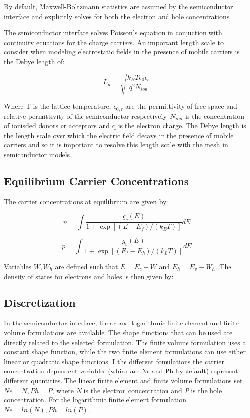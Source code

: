 By default, Maxwell-Boltzmann statistics are assumed by the semiconductor interface and explicitly solves for both the electron and hole concentrations.

The semiconductor interface solves Poisson's equation in conjuction with continuity equations for the charge carriers. An important length scale to consider when modeling electrostatic fields in the presence of mobile carriers is the Debye length of:

\begin{equation}
	L_{d} = \sqrt{\frac{k_{B}T\epsilon_{0} \epsilon_{r}}{q^{2}N_{ion}}}
\end{equation}

Where T is the lattice temperature, $\epsilon_{0,r}$ are the permittivity of free space and relative permittivity of the semiconductor respectively, $N_{ion}$ is the concentration of ionisded donors or acceptors and q is the electron charge. The Debye length is the length scale over which the electric field decays in the presence of mobile carriers and so it is important to resolve this length scale with the mesh in semiconductor models.

\subsection{Equilibrium Carrier Concentrations}
The carrier concentrations at equilibrium are given by:

\begin{equation}
n=\int \frac{g_{c}\left(E\right)}{1+\exp\left[\left(E-E_{f}\right)/\left(k_{B}T\right)\right]}dE
\end{equation}

\begin{equation}
p=\int \frac{g_{v}\left(E\right)}{1+\exp\left[\left(E_{f}-E_{h}\right)/\left(k_{B}T\right)\right]}dE
\end{equation}

Variables $W, W_{h}$ are defined such that $E=E_{c}+W$ and $E_{h}=E_{v}-W_{h}$. The density of states for electrons and holes is then given by:

\subsection{Discretization}

In the semiconductor interface, linear and logarithmic finite element and finite volume formulations are available. The shape functions that can be used are directly related to the selected formulation. The finite volume formulation uses a constant shape function, while the two finite element formulations can use either linear or quadratic shape functions. I the different fomulations the carrier concentration dependent variables (which are Nr and Ph by default) represent different quantities. The linear finite element and finite volume formulations set $Ne=N, Ph=P$, where $N$ is the electron concentration and $P$ is the hole concentration. For the logarithmic finite element formulation $Ne=ln\left(N\right), Ph=ln\left(P\right)$. 

